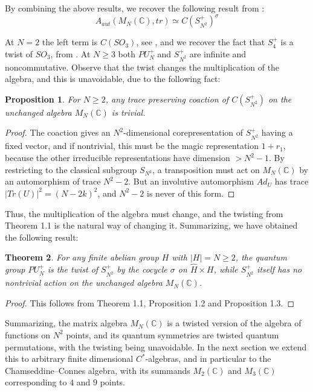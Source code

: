 \documentclass[11pt]{amsart}
\newtheorem{theorem}{Theorem}[section]
\newtheorem{proposition}[theorem]{Proposition}
\theoremstyle{definition}
\begin{document}
By combining the above results, we recover the following result from \cite{bbc}:
$$A_{aut}(M_N(\mathbb C),tr)\simeq C(S_{N^2}^+)^\sigma$$

At $N=2$ the left term is $C(SO_3)$, see \cite{ban,bddd}, and we recover the fact that $S_4^+$ is a twist of $SO_3$, from \cite{bbi}. At $N\geq3$ both $PU_N^+$ and $S_{N^2}^+$ are infinite and noncommutative. Observe that the twist changes the multiplication of the algebra, and this is unavoidable, due to the following fact:

\begin{proposition}
For $N\geq2$, any trace preserving coaction of $C(S_{N^2}^+)$ on the unchanged algebra $M_N(\mathbb C)$ is trivial.
\end{proposition}

\begin{proof}
The coaction gives an $N^2$-dimensional corepresentation of $S_{N^2}^+$ having a fixed vector, and if nontrivial, this must be the magic representation $1+r_1$, because the other irreducible representations have dimension $>N^2-1$. By restricting to the classical subgroup $S_{N^2}$, a transposition must act on $M_N(\mathbb C)$ by an automorphism of trace $N^2-2$. But an involutive automorphism $Ad_U$ has trace $|Tr(U)|^2=(N-2k)^2$, and $N^2-2$ is never of this form.
\end{proof}

Thus, the multiplication of the algebra must change, and the twisting from Theorem 1.1 is the natural way of changing it. Summarizing, we have obtained the following result:

\begin{theorem}
For any finite abelian group $H$ with $|H|=N\geq2$, the quantum group $PU_N^+$ is the twist of $S_{N^2}^+$ by the cocycle $\sigma$ on $\widehat{H}\times H$, while $S_{N^2}^+$ itself has no nontrivial action on the unchanged algebra $M_N(\mathbb C)$.
\end{theorem}

\begin{proof}
This follows from Theorem 1.1, Proposition 1.2 and Proposition 1.3.
\end{proof}

Summarizing, the matrix algebra $M_N(\mathbb C)$ is a twisted version of the algebra of functions on $N^2$ points, and its quantum symmetries are twisted quantum permutations, with the twisting being unavoidable. In the next section we extend this to arbitrary finite dimensional $C^*$-algebras, and in particular to the Chamseddine--Connes algebra, with its summands $M_2(\mathbb C)$ and $M_3(\mathbb C)$ corresponding to $4$ and $9$ points.
\end{document}
